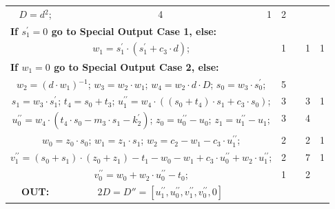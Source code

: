 \begin{tabular}{|c|cr|c|c|c|c|}
{$D=d{}^{2}$;\hspace{4pt}
} & 4 & 1 & 2 & \\
\multicolumn{3}{|l|}{ 
 \bf{If $s^{\prime}_1 = 0$ go to Special Output Case 1, else:} } &  &  &  & \\
\multicolumn{3}{|R{340pt}|}{ 
$w_1=s^{\prime}_1 \cdot (s^{\prime}_1+c_3 \cdot d)$;\hspace{4pt}
} & 1 &  & 1 & 1\\
\multicolumn{3}{|l|}{ 
 \bf{If $w_1 = 0$ go to Special Output Case 2, else:} } &  &  &  & \\
\multicolumn{3}{|R{340pt}|}{ 
$w_2=(d \cdot w_1){}^{-1}$;\hspace{4pt}
$w_3=w_2 \cdot w_1$;\hspace{4pt}
$w_4=w_2 \cdot d \cdot D$;\hspace{4pt}
$s_0=w_3 \cdot s^{\prime}_0$;\hspace{4pt}
} & 5 &  &  & \\
\multicolumn{3}{|R{340pt}|}{ 
$s_1=w_3 \cdot s^{\prime}_1$;\hspace{4pt}
$t_4=s_0+t_3$;\hspace{4pt}
$u^{\prime\prime}_1=w_4 \cdot ((s_0+t_4) \cdot s_1+c_3 \cdot s_0)$;\hspace{4pt}
} & 3 &  & 3 & 1\\
\multicolumn{3}{|R{340pt}|}{ 
$u^{\prime\prime}_0=w_4 \cdot (t_4 \cdot s_0-m_3 \cdot s_1-k_2^{\prime})$;\hspace{4pt}
$z_0=u^{\prime\prime}_0-u_0$;\hspace{4pt}
$z_1=u^{\prime\prime}_1-u_1$;\hspace{4pt}
} & 3 &  & 4 & \\
\multicolumn{3}{|R{340pt}|}{ 
$w_0=z_0 \cdot s_0$;\hspace{4pt}
$w_1=z_1 \cdot s_1$;\hspace{4pt}
$w_2=c_2-w_1-c_3 \cdot u^{\prime\prime}_1$;\hspace{4pt}
} & 2 &  & 2 & 1\\
\multicolumn{3}{|R{340pt}|}{ 
$v^{\prime\prime}_1=(s_0+s_1) \cdot (z_0+z_1)-t_1-w_0-w_1+c_3 \cdot u^{\prime\prime}_0+w_2 \cdot u^{\prime\prime}_1$;\hspace{4pt}
} & 2 &  & 7 & 1\\
\multicolumn{3}{|R{340pt}|}{ 
$v^{\prime\prime}_0=w_0+w_2 \cdot u^{\prime\prime}_0-t_0$;\hspace{4pt}
} & 1 &  & 2 & \\
\hline
\bf{OUT:} & \hspace*{65pt} $2D = D'' = [u^{\prime\prime}_1,u^{\prime\prime}_0,v^{\prime\prime}_1,v^{\prime\prime}_0,0]$

\end{tabular}

